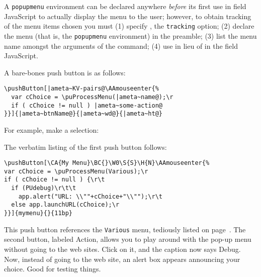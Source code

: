 \documentclass{article}
\let\opt\texttt
\let\env\texttt
\def\darg#1{\texttt{\{#1\}}}
\let\amtIndent\leftmargini
\begin{document}
A \env{popupmenu} environment can be declared anywhere \emph{before} its first use in
field Java\-Script to actually display the menu to the user; however, to obtain
tracking of the menu items chosen you must (1) specify
\cs{usepackage[tracking]\darg{popupmenu}}, the \opt{tracking} option; (2)
declare the menu (that is, the \env{popupmenu} environment) in the preamble; (3) list the menu name
amongst the arguments of the  command; (4) use
 in lieu of  in the field JavaScript.

\newtopic\noindent A bare-bones push button is as follows:
\begin{Verbatim}[xleftmargin=\amtIndent,fontsize=\small,commandchars={|~@}]
\pushButton[|ameta~KV-pairs@\AAmouseenter{%
  var cChoice = \puProcessMenu(|ameta~name@);\r
  if ( cChoice != null ) |ameta~some-action@
}}]{|ameta~btnName@}{|ameta~wd@}{|ameta~ht@}
\end{Verbatim}


\newtopic\noindent
For example, make a selection: \olBdry\,

\newtopic\noindent The verbatim listing of the first push button follows:
\begin{Verbatim}[xleftmargin=\amtIndent,fontsize=\small,commandchars={|~@}]
\pushButton[\CA{My Menu}\BC{}\W0\S{S}\H{N}\AAmouseenter{%
var cChoice = \puProcessMenu(Various);\r
if ( cChoice != null ) {\r\t
  if (PUdebug)\r\t\t
    app.alert("URL: \\""+cChoice+"\\"");\r\t
  else app.launchURL(cChoice);\r
}}]{mymenu}{}{11bp}
\end{Verbatim}
This push button references the \texttt{Various} menu, tediously listed on
page~\pageref*{para:Various}. The second button, labeled \textsf{Action},
allows you to play around with the pop-up menu without going to the web
sites. Click on it, and the caption now says \textsf{Debug}. Now, instead of
going to the web site, an alert box appears announcing your choice. Good for
testing things.
\end{document}
